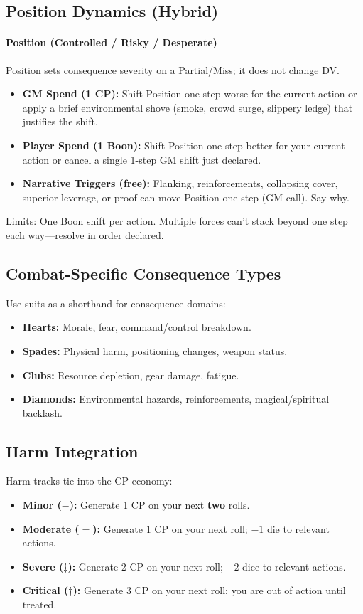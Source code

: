 \subsection{Position Dynamics (Hybrid)}
\paragraph{Position (Controlled / Risky / Desperate)}
Position sets consequence severity on a Partial/Miss; it does not change DV.
\begin{itemize}
  \item \textbf{GM Spend (1 CP):} Shift Position one step worse for the current action or apply a brief environmental shove (smoke, crowd surge, slippery ledge) that justifies the shift.
  \item \textbf{Player Spend (1 Boon):} Shift Position one step better for your current action or cancel a single 1-step GM shift just declared.
  \item \textbf{Narrative Triggers (free):} Flanking, reinforcements, collapsing cover, superior leverage, or proof can move Position one step (GM call). Say why.
\end{itemize}
Limits: One Boon shift per action. Multiple forces can’t stack beyond one step each way—resolve in order declared.

\subsection{Combat-Specific Consequence Types}
Use suits as a shorthand for consequence domains:
\begin{itemize}
  \item \textbf{Hearts:} Morale, fear, command/control breakdown.
  \item \textbf{Spades:} Physical harm, positioning changes, weapon status.
  \item \textbf{Clubs:} Resource depletion, gear damage, fatigue.
  \item \textbf{Diamonds:} Environmental hazards, reinforcements, magical/spiritual backlash.
\end{itemize}

\subsection{Harm Integration}
Harm tracks tie into the CP economy:
\begin{itemize}
  \item \textbf{Minor ($-$):} Generate 1 CP on your next \textbf{two} rolls.
  \item \textbf{Moderate ($=$):} Generate 1 CP on your next roll; $-1$ die to relevant actions.
  \item \textbf{Severe ($\ddagger$):} Generate 2 CP on your next roll; $-2$ dice to relevant actions.
  \item \textbf{Critical ($\dagger$):} Generate 3 CP on your next roll; you are out of action until treated.
\end{itemize}

